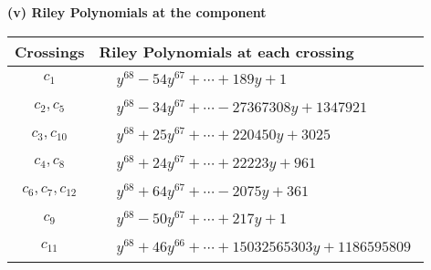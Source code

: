 \documentclass[1p]{elsarticle_modified}
\theoremstyle{definition}
\begin{document}
\flushleft \textbf{(v) Riley Polynomials at the component}\newline \\
\begin{tabular}{m{50pt}|m{274pt}}
Crossings & \hspace{64pt}Riley Polynomials at each crossing \\
\hline $$\begin{aligned}c_{1}\end{aligned}$$&$\begin{aligned}
&y^{68}-54 y^{67}+\cdots+189 y+1
\end{aligned}$\\
\hline $$\begin{aligned}c_{2},c_{5}\end{aligned}$$&$\begin{aligned}
&y^{68}-34 y^{67}+\cdots-27367308 y+1347921
\end{aligned}$\\
\hline $$\begin{aligned}c_{3},c_{10}\end{aligned}$$&$\begin{aligned}
&y^{68}+25 y^{67}+\cdots+220450 y+3025
\end{aligned}$\\
\hline $$\begin{aligned}c_{4},c_{8}\end{aligned}$$&$\begin{aligned}
&y^{68}+24 y^{67}+\cdots+22223 y+961
\end{aligned}$\\
\hline $$\begin{aligned}c_{6},c_{7},c_{12}\end{aligned}$$&$\begin{aligned}
&y^{68}+64 y^{67}+\cdots-2075 y+361
\end{aligned}$\\
\hline $$\begin{aligned}c_{9}\end{aligned}$$&$\begin{aligned}
&y^{68}-50 y^{67}+\cdots+217 y+1
\end{aligned}$\\
\hline $$\begin{aligned}c_{11}\end{aligned}$$&$\begin{aligned}
&y^{68}+46 y^{66}+\cdots+15032565303 y+1186595809
\end{aligned}$\\
\hline
\end{tabular}\\~\\
\end{document}
